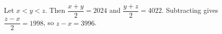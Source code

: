 Let $x<y<z$. Then $\dfrac{x+y}{2}=2024$ and $\dfrac{y+z}{2}=4022$. Subtracting gives $\dfrac{z-x}{2}=1998$, so $\boxed{z-x=3996}$.
